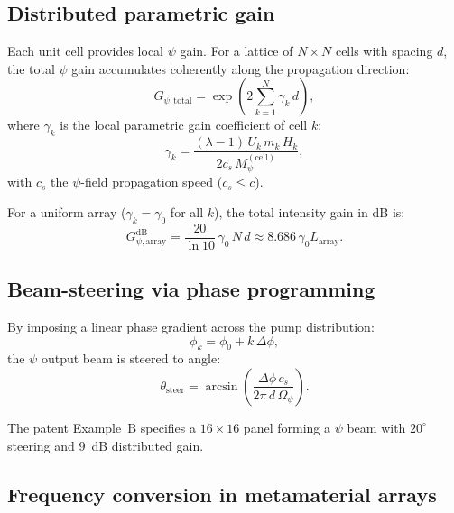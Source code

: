\documentclass[12pt,aps,prd,twocolumn,superscriptaddress,nofootinbib]{revtex4-2}
\newcommand{\Opsi}{\Omega_\psi}
\newcommand{\Mpsi}{M_\psi}
\begin{document}
\subsection{Distributed parametric gain}

Each unit cell provides local $\psi$ gain.  For a lattice of $N \times N$
cells with spacing $d$, the total $\psi$ gain accumulates coherently
along the propagation direction:
\begin{equation}
  G_{\psi,\mathrm{total}} = \exp\!\left(
    2\sum_{k=1}^{N}\gamma_k\,d
  \right),
  \label{eq:distributed_gain}
\end{equation}
where $\gamma_k$ is the local parametric gain coefficient of cell $k$:
\begin{equation}
  \gamma_k = \frac{(\lambda-1)\,U_k\,m_k\,H_k}{2c_s\,\Mpsi^{(\mathrm{cell})}},
  \label{eq:local_gain}
\end{equation}
with $c_s$ the $\psi$-field propagation speed ($c_s \leq c$).

For a uniform array ($\gamma_k = \gamma_0$ for all $k$), the total
intensity gain in dB is:
\begin{equation}
  G^{\mathrm{dB}}_{\psi,\mathrm{array}} = \frac{20}{\ln 10}\,
    \gamma_0\,N\,d \approx 8.686\,\gamma_0 L_{\mathrm{array}}.
  \label{eq:array_gain_dB}
\end{equation}

\subsection{Beam-steering via phase programming}

By imposing a linear phase gradient across the pump distribution:
\begin{equation}
  \phi_k = \phi_0 + k\,\Delta\phi,
  \label{eq:phase_gradient}
\end{equation}
the $\psi$ output beam is steered to angle:
\begin{equation}
  \theta_{\mathrm{steer}} = \arcsin\!\left(
    \frac{\Delta\phi\,c_s}{2\pi\,d\,\Opsi}
  \right).
  \label{eq:steer_angle}
\end{equation}

The patent Example~B specifies a $16\times 16$ panel forming a $\psi$
beam with $20^\circ$ steering and $9$~dB distributed gain.

\subsection{Frequency conversion in metamaterial arrays}
\end{document}
